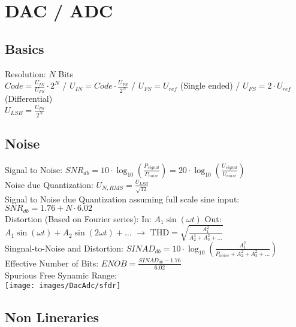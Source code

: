 \section{DAC / ADC}

\subsection{Basics}
Resolution: $N$ Bits \\
$Code = \frac{U_{IN}}{U_{FS}} \cdot 2^N$ / $U_{IN} = Code \cdot \frac{U_{FS}}{2^N}$ / $U_{FS} = U_{ref}$ (Single ended) / $U_{FS} = 2 \cdot U_{ref}$ (Differential)\\
$U_{LSB} = \frac{U_{FS}}{2^N}$

\subsection{Noise}
Signal to Noise: $SNR_{db} = 10 \cdot \log_{10}(\frac{P_{signal}}{P_{noise}}) = 20 \cdot \log_{10}(\frac{U_{signal}}{U_{noise}})$\\
Noise due Quantization: $U_{N,RMS} = \frac{U_{LSB}}{\sqrt{12}}$\\
Signal to Noise due Quantization assuming full scale sine input: $SNR_{db} = 1.76 + N \cdot 6.02$\\
Distortion (Based on Fourier series): In: $A_1 \sin(\omega t)$ Out: $A_1 \sin(\omega t) + A_2 \sin(2 \omega t) + \hdots$ $\rightarrow$ $\text{THD} = \sqrt{\frac{A_1^2}{A_2^2 + A_3^2 + \hdots}}$\\
Singnal-to-Noise and Distortion: $SINAD_{db} = 10 \cdot \log_{10}\left(\frac{A_1^2}{P_{noise} + A_2^2 + A_3^2 + \hdots}\right)$\\
Effective Number of Bits: $ENOB = \frac{SINAD_{db} - 1.76}{6.02}$\\
Spurious Free Synamic Range:\\
\texttt{[image: images/DacAdc/sfdr]}

\subsection{Non Lineraries}

